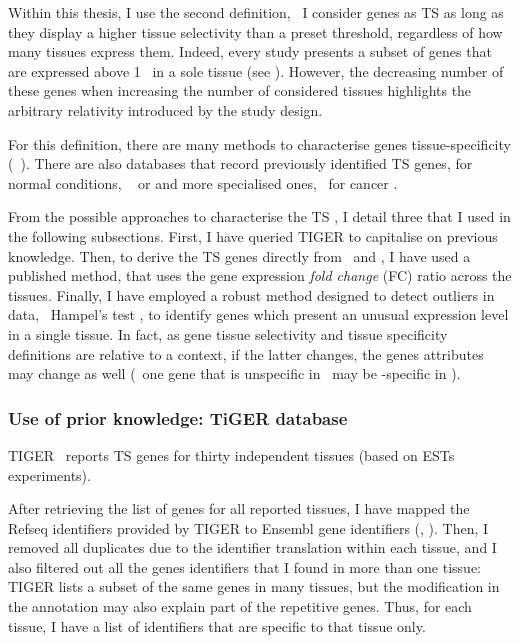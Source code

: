 Within this thesis, I use the second definition,
\ie\ I consider genes as \gls{TS}
as long as they display a higher tissue selectivity than a preset threshold,
regardless of how many tissues express them.
Indeed, every study presents a subset of genes
that are expressed above 1 \FPKM\
in a sole tissue (see ).
However, the decreasing number of these genes
when increasing the number of considered tissues highlights
the arbitrary relativity introduced by the study design.\mybr\

For this definition,
there are many methods to characterise genes tissue-specificity
(\eg\ \citet{Cavalli2011-bo,Xiao2010-mz,Karthik2016-mu,Kim2017-dz,%
Kryuchkova-Mostacci2017-mk,Kadota2006-eb,Yu2006-ha,Martinez2008-bm}).
There are also databases that record previously identified \gls{TS} genes,
for normal conditions,
\eg\  or
and more specialised ones, \eg\ for cancer
.\mybr\

From the possible approaches to characterise the \gls{TS} \pcgs,
I detail three that I used in the following subsections.
First, I have queried \gls{TIGER} to capitalise on previous knowledge.
Then, to derive the \gls{TS} genes directly from \setOne\ and \setTwo,
I have used a published method,
that uses the gene expression \emph{fold change} (FC) ratio across the tissues.
Finally, I have employed a robust method designed to detect outliers in data,
\ie\ Hampel's test \mycite{Hampel1974},
to identify genes which present an unusual expression level in a single tissue.
In fact, as gene tissue selectivity and tissue specificity definitions are
relative to a context,
if the latter changes,
the genes attributes may change as well
(\eg\ one gene that is unspecific in \setTwo\ may be \heart{}-specific in \setOne).\mybr\


\subsubsection{Use of prior knowledge: TiGER database}\label{subsub:Tiger}

\gls{TIGER}~ reports \gls{TS} genes for thirty independent tissues
(based on \glspl{EST} experiments).\mybr\

After retrieving the list of genes for all reported tissues,
I have mapped the \gls{Refseq} identifiers provided by \gls{TIGER}
to \gls{Ensembl} gene identifiers (\hg{38}, \ens{76}).
Then, I removed all duplicates due to the identifier translation within each tissue,
and I also filtered out all the genes identifiers that
I found in more than one tissue:
\gls{TIGER} lists a subset of the same genes in many tissues,
but the modification in the annotation may also explain part of the
repetitive genes.
Thus, for each tissue,
I have a list of identifiers that are specific to that tissue only.\mybr\

